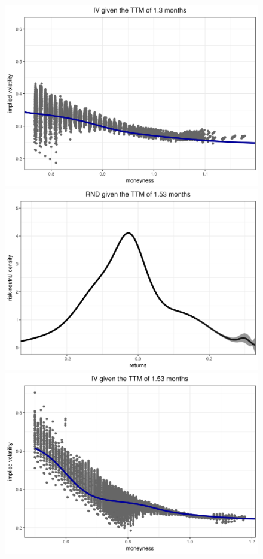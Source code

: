\documentclass[a4paper,12pt]{article}
\theoremstyle{plain}
\theoremstyle{definition}
\begin{document}
\begin{figure}[H]
\begin{center}
 \endminipage
 \hspace{3mm}
 \includegraphics[width=\linewidth]{figures/hour_3th/GOOG_20150105_iv_smile_3th_hour_ttm_1_3.png}
 \endminipage\\
 \includegraphics[width=\linewidth]{figures/hour_3th/GOOG_20150105_rnd_ci_3th_hour_ttm_1_53.png}
 \endminipage
 \hspace{3mm}
 \includegraphics[width=\linewidth]{figures/hour_3th/GOOG_20150105_iv_smile_3th_hour_ttm_1_53.png}

\end{center}
\end{figure}
\end{document}
